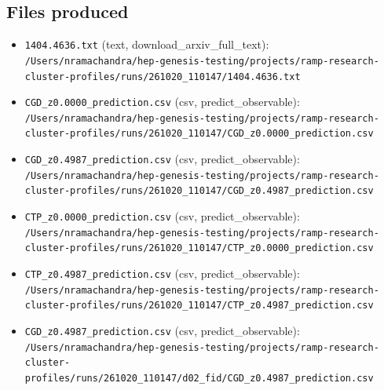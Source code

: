 \documentclass[11pt,a4paper]{article}
\begin{document}
\subsection{Files produced}
\begin{itemize}
  \item \texttt{1404.4636.txt} (text, download\_arxiv\_full\_text): \texttt{/\allowbreak{}Users/\allowbreak{}nramachandra/\allowbreak{}hep-genesis-testing/\allowbreak{}projects/\allowbreak{}ramp-research-cluster-profiles/\allowbreak{}runs/\allowbreak{}261020\_\allowbreak{}110147/\allowbreak{}1404.4636.txt}
  \item \texttt{CGD\_\allowbreak{}z0.0000\_\allowbreak{}prediction.csv} (csv, predict\_observable): \texttt{/\allowbreak{}Users/\allowbreak{}nramachandra/\allowbreak{}hep-genesis-testing/\allowbreak{}projects/\allowbreak{}ramp-research-cluster-profiles/\allowbreak{}runs/\allowbreak{}261020\_\allowbreak{}110147/\allowbreak{}CGD\_\allowbreak{}z0.0000\_\allowbreak{}prediction.csv}
  \item \texttt{CGD\_\allowbreak{}z0.4987\_\allowbreak{}prediction.csv} (csv, predict\_observable): \texttt{/\allowbreak{}Users/\allowbreak{}nramachandra/\allowbreak{}hep-genesis-testing/\allowbreak{}projects/\allowbreak{}ramp-research-cluster-profiles/\allowbreak{}runs/\allowbreak{}261020\_\allowbreak{}110147/\allowbreak{}CGD\_\allowbreak{}z0.4987\_\allowbreak{}prediction.csv}
  \item \texttt{CTP\_\allowbreak{}z0.0000\_\allowbreak{}prediction.csv} (csv, predict\_observable): \texttt{/\allowbreak{}Users/\allowbreak{}nramachandra/\allowbreak{}hep-genesis-testing/\allowbreak{}projects/\allowbreak{}ramp-research-cluster-profiles/\allowbreak{}runs/\allowbreak{}261020\_\allowbreak{}110147/\allowbreak{}CTP\_\allowbreak{}z0.0000\_\allowbreak{}prediction.csv}
  \item \texttt{CTP\_\allowbreak{}z0.4987\_\allowbreak{}prediction.csv} (csv, predict\_observable): \texttt{/\allowbreak{}Users/\allowbreak{}nramachandra/\allowbreak{}hep-genesis-testing/\allowbreak{}projects/\allowbreak{}ramp-research-cluster-profiles/\allowbreak{}runs/\allowbreak{}261020\_\allowbreak{}110147/\allowbreak{}CTP\_\allowbreak{}z0.4987\_\allowbreak{}prediction.csv}
  \item \texttt{CGD\_\allowbreak{}z0.4987\_\allowbreak{}prediction.csv} (csv, predict\_observable): \texttt{/\allowbreak{}Users/\allowbreak{}nramachandra/\allowbreak{}hep-genesis-testing/\allowbreak{}projects/\allowbreak{}ramp-research-cluster-profiles/\allowbreak{}runs/\allowbreak{}261020\_\allowbreak{}110147/\allowbreak{}d02\_\allowbreak{}fid/\allowbreak{}CGD\_\allowbreak{}z0.4987\_\allowbreak{}prediction.csv}

\end{itemize}
\end{document}

